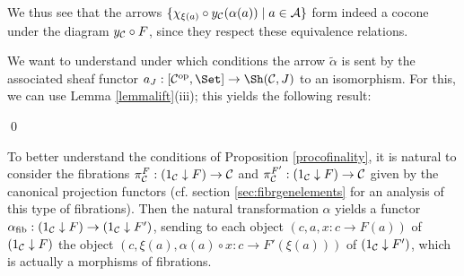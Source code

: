 \documentclass[a4paper,12pt]{article}
\begin{document}
We thus see that the arrows $\{\chi_{\xi(a)}\circ y_{\cal C}(\alpha(a)) \mid a\in {\cal A}\}$ form indeed a cocone under the diagram $y_{\cal C}\circ F$, since they respect these equivalence relations. 

We want to understand under which conditions the arrow $\tilde{\alpha}$ is sent by the associated sheaf functor $a_{J}:[{\cal C}^{\textup{op}}, \Set] \to \Sh({\cal C}, J)$ to an isomorphism. For this, we can use Lemma \ref{lemmalift}(iii); this yields the following result: 

\qed

To better understand the conditions of Proposition \ref{procofinality}, it is natural to consider the fibrations $\pi_{\cal C}^{F}:(1_{\cal C}\downarrow F)\to {\cal C}$ and $\pi^{F'}_{\cal C}:(1_{\cal C}\downarrow F)\to {\cal C}$ given by the canonical projection functors (cf. section \ref{sec:fibrgenelements} for an analysis of this type of fibrations). Then the natural transformation $\alpha$ yields a functor $\alpha_{\textup{fib}}: (1_{\cal C}\downarrow F) \to (1_{\cal C}\downarrow F')$, sending to each object $(c, a, x:c\to F(a))$ of $(1_{\cal C}\downarrow F)$ the object $(c, \xi(a), \alpha(a)\circ x:c\to F'(\xi(a)))$ of $(1_{\cal C}\downarrow F')$, which is actually a morphisms of fibrations.  
\end{document}
